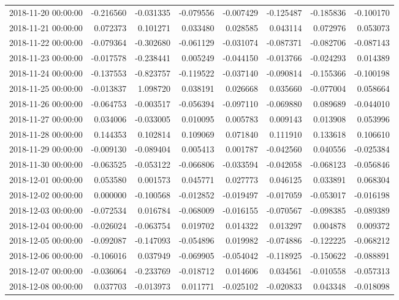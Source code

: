 \begin{tabular}{lrrrrrrr}
2018-11-20 00:00:00 & -0.216560 & -0.031335 & -0.079556 & -0.007429 & -0.125487 & -0.185836 & -0.100170 \\
2018-11-21 00:00:00 & 0.072373 & 0.101271 & 0.033480 & 0.028585 & 0.043114 & 0.072976 & 0.053073 \\
2018-11-22 00:00:00 & -0.079364 & -0.302680 & -0.061129 & -0.031074 & -0.087371 & -0.082706 & -0.087143 \\
2018-11-23 00:00:00 & -0.017578 & -0.238441 & 0.005249 & -0.044150 & -0.013766 & -0.024293 & 0.014389 \\
2018-11-24 00:00:00 & -0.137553 & -0.823757 & -0.119522 & -0.037140 & -0.090814 & -0.155366 & -0.100198 \\
2018-11-25 00:00:00 & -0.013837 & 1.098720 & 0.038191 & 0.026668 & 0.035660 & -0.077004 & 0.058664 \\
2018-11-26 00:00:00 & -0.064753 & -0.003517 & -0.056394 & -0.097110 & -0.069880 & 0.089689 & -0.044010 \\
2018-11-27 00:00:00 & 0.034006 & -0.033005 & 0.010095 & 0.005783 & 0.009143 & 0.013908 & 0.053996 \\
2018-11-28 00:00:00 & 0.144353 & 0.102814 & 0.109069 & 0.071840 & 0.111910 & 0.133618 & 0.106610 \\
2018-11-29 00:00:00 & -0.009130 & -0.089404 & 0.005413 & 0.001787 & -0.042560 & 0.040556 & -0.025384 \\
2018-11-30 00:00:00 & -0.063525 & -0.053122 & -0.066806 & -0.033594 & -0.042058 & -0.068123 & -0.056846 \\
2018-12-01 00:00:00 & 0.053580 & 0.001573 & 0.045771 & 0.027773 & 0.046125 & 0.033891 & 0.068304 \\
2018-12-02 00:00:00 & 0.000000 & -0.100568 & -0.012852 & -0.019497 & -0.017059 & -0.053017 & -0.016198 \\
2018-12-03 00:00:00 & -0.072534 & 0.016784 & -0.068009 & -0.016155 & -0.070567 & -0.098385 & -0.089389 \\
2018-12-04 00:00:00 & -0.026024 & -0.063754 & 0.019702 & 0.014322 & 0.013297 & 0.004878 & 0.009372 \\
2018-12-05 00:00:00 & -0.092087 & -0.147093 & -0.054896 & 0.019982 & -0.074886 & -0.122225 & -0.068212 \\
2018-12-06 00:00:00 & -0.106016 & 0.037949 & -0.069905 & -0.054042 & -0.118925 & -0.150622 & -0.088891 \\
2018-12-07 00:00:00 & -0.036064 & -0.233769 & -0.018712 & 0.014606 & 0.034561 & -0.010558 & -0.057313 \\
2018-12-08 00:00:00 & 0.037703 & -0.013973 & 0.011771 & -0.025102 & -0.020833 & 0.043348 & -0.018098 \\

\end{tabular}
